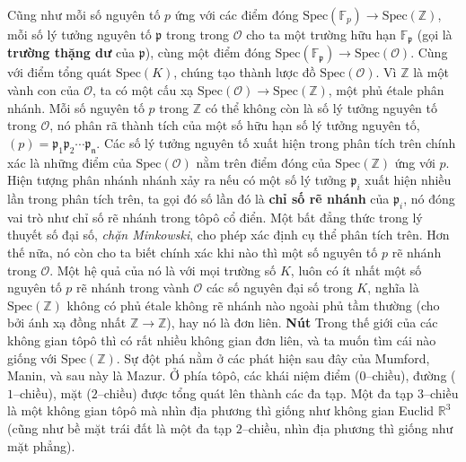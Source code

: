 \begin{multicols}{2}
	\vskip 0.1cm
	Cũng như mỗi số nguyên tố $p$ ứng với các điểm đóng $\text{Spec}(\mathbb{F}_p) \to \text{Spec}(\mathbb{Z})$, mỗi số lý tưởng nguyên tố $\mathfrak{p}$ trong trong $\mathcal{O}$ cho ta một trường hữu hạn $\mathbb{F}_{\mathfrak{p}}$ (gọi là {\bf\color{duongvaotoanhoc} trường thặng dư} của $\mathfrak{p}$), cùng một điểm đóng $\text{Spec}(\mathbb{F}_{\mathfrak{p}}) \to \text{Spec}(\mathcal{O})$. Cùng với điểm tổng quát $\text{Spec}(K)$, chúng tạo thành lược đồ $\text{Spec}(\mathcal{O})$. Vì $\mathbb{Z}$ là một vành con của $\mathcal{O}$, ta có một cấu xạ $\text{Spec}(\mathcal{O}) \to \text{Spec}(\mathbb{Z})$, một phủ étale phân nhánh. Mỗi số nguyên tố $p$ trong $\mathbb{Z}$ có thể không còn là số lý tưởng nguyên tố trong $\mathcal{O}$, nó phân rã thành tích của một số hữu hạn số lý tưởng nguyên tố, $(p) = \mathfrak{p_1}\mathfrak{p_2}\cdots\mathfrak{p_n}$. Các số lý tưởng nguyên tố xuất hiện trong phân tích trên chính xác là những điểm của $\text{Spec}(\mathcal{O})$ nằm trên điểm đóng của $\text{Spec}(\mathbb{Z})$ ứng với $p$. Hiện tượng phân nhánh nhánh xảy ra nếu có một số lý tưởng $\mathfrak{p}_i$ xuất hiện nhiều lần trong phân tích trên, ta gọi đó số lần đó là {\bf\color{duongvaotoanhoc} chỉ số rẽ nhánh} của $\mathfrak{p}_i$, nó đóng vai trò như chỉ số rẽ nhánh trong tôpô cổ điển.
	\vskip 0.1cm
	Một bất đẳng thức trong lý thuyết số đại số, {\it chặn Minkowski}, cho phép xác định cụ thể phân tích trên. Hơn thế nữa, nó còn cho ta biết chính xác khi nào thì một số nguyên tố $p$ rẽ nhánh trong $\mathcal{O}$. Một hệ quả của nó là với mọi trường số $K$, luôn có ít nhất một số nguyên tố $p$ rẽ nhánh trong vành $\mathcal{O}$ các số nguyên đại số trong $K$, nghĩa là $\text{Spec}(\mathbb{Z})$ không có phủ  étale không rẽ nhánh nào ngoài phủ tầm thường (cho bởi ánh xạ đồng nhất $\mathbb{Z} \to \mathbb{Z}$), hay nó là đơn liên.
	\vskip 0.1cm
	\textbf{\color{duongvaotoanhoc}Nút}
	\vskip 0.1cm
	Trong thế giới của các không gian tôpô thì có rất nhiều không gian đơn liên, và ta muốn tìm cái nào giống với $\text{Spec}(\mathbb{Z})$. Sự đột phá nằm ở các phát hiện sau đây của Mumford, Manin, và sau này là Mazur. Ở phía tôpô, các khái niệm điểm ($0$--chiều), đường ($1$--chiều), mặt ($2$--chiều) được tổng quát lên thành các đa tạp. Một đa tạp $3$--chiều là một không gian tôpô mà nhìn địa phương thì giống như không gian Euclid $\mathbb{R}^3$ (cũng như bề mặt trái đất là một đa tạp $2$--chiều, nhìn địa phương thì giống như mặt phẳng).
	\vskip 0.1cm

\end{multicols}

